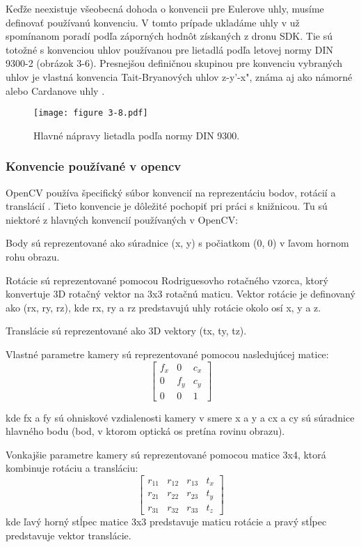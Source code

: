 {Keďže neexistuje všeobecná dohoda o konvencii pre Eulerove uhly, musíme definovať používanú konvenciu. V tomto prípade ukladáme uhly v už spomínanom poradí podľa záporných hodnôt získaných z dronu SDK. Tie sú totožné s konvenciou uhlov používanou pre lietadlá podľa letovej normy DIN 9300-2 (obrázok 3-6). Presnejšou definičnou skupinou pre konvenciu vybraných uhlov je vlastná konvencia Tait-Bryanových uhlov z-y'-x", známa aj ako námorné alebo Cardanove uhly \citep{DIN9300-2}.
\begin{figure}[ht!]
    \centering
    \texttt{[image: figure 3-8.pdf]}
    \caption{Hlavné nápravy lietadla podľa normy DIN 9300.}
    \label{o:3-8} 
\end{figure} 

\subsubsection{Konvencie používané v opencv}
OpenCV používa špecifický súbor konvencií na reprezentáciu bodov, rotácií a translácií \citep{opencv_calib3d}. Tieto konvencie je dôležité pochopiť pri práci s knižnicou. Tu sú niektoré z hlavných konvencií používaných v OpenCV:

Body sú reprezentované ako súradnice (x, y) s počiatkom (0, 0) v ľavom hornom rohu obrazu.

Rotácie sú reprezentované pomocou Rodriguesovho rotačného vzorca, ktorý konvertuje 3D rotačný vektor na 3x3 rotačnú maticu. Vektor rotácie je definovaný ako (rx, ry, rz), kde rx, ry a rz predstavujú uhly rotácie okolo osí x, y a z.

Translácie sú reprezentované ako 3D vektory (tx, ty, tz).

Vlastné parametre kamery sú reprezentované pomocou nasledujúcej matice:
\begin{equation}
\begin{bmatrix}
f_x & 0 & c_x \\
0 & f_y & c_y \\
0 & 0 & 1
\end{bmatrix}
\end{equation}

kde fx a fy sú ohniskové vzdialenosti kamery v smere x a y a cx a cy sú súradnice hlavného bodu (bod, v ktorom optická os pretína rovinu obrazu).

Vonkajšie parametre kamery sú reprezentované pomocou matice 3x4, ktorá kombinuje rotáciu a transláciu:
\begin{equation}
\begin{bmatrix}
r_{11} & r_{12} & r_{13} & t_x \\
r_{21} & r_{22} & r_{23} & t_y \\
r_{31} & r_{32} & r_{33} & t_z
\end{bmatrix}
\end{equation}
kde ľavý horný stĺpec matice 3x3 predstavuje maticu rotácie a pravý stĺpec predstavuje vektor translácie.

}
